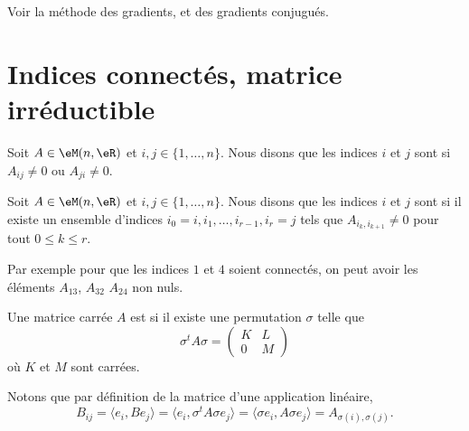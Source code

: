 Voir la méthode des gradients, et des gradients conjugués.

\section{Indices connectés, matrice irréductible}

\begin{definition}
	Soit \( A\in \eM(n,\eR)\) et \( i,j\in\{ 1,\ldots, n \}\). Nous disons que les indices \( i\) et \( j\) sont  si \( A_{ij}\neq 0\) ou \( A_{ji}\neq 0\).
\end{definition}

\begin{definition}      \label{DEFooADAAooAAMscc}
	Soit \( A\in \eM(n,\eR)\) et \( i,j\in\{ 1,\ldots, n \}\). Nous disons que les indices \( i\) et \( j\) sont  si il existe un ensemble d'indices \( i_0=i,i_1,\ldots, i_{r-1},i_r=j   \) tels que \( A_{i_k,i_{k+1}}\neq 0\) pour tout \( 0\leq k\leq r\).
\end{definition}

Par exemple pour que les indices \( 1\) et \( 4\) soient connectés, on peut avoir les éléments \( A_{13}\), \( A_{32}\) \( A_{24}\) non nuls.

\begin{definition}      \label{DEFooXIREooQtlzkO}
	Une matrice carrée \( A\) est  si il existe une permutation \( \sigma\) telle que
	\begin{equation}        \label{EQooGGZKooUyXSJk}
		\sigma^tA\sigma=\begin{pmatrix}
			K & L \\
			0 & M
		\end{pmatrix}
	\end{equation}
	où \( K\) et \( M\) sont carrées.
\end{definition}
Notons que par définition de la matrice d'une application linéaire,
\begin{equation}
	B_{ij}= \langle e_i, Be_j\rangle =\langle e_i, \sigma^tA\sigma e_j\rangle =\langle \sigma e_i, A\sigma e_j\rangle =A_{\sigma(i),\sigma(j)}.
\end{equation}


